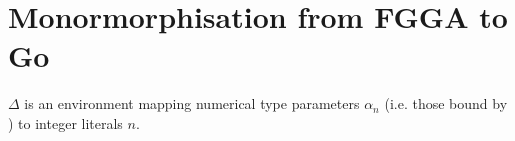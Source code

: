 \section{Monormorphisation from FGGA to Go}

$\Delta$ is an environment mapping numerical type parameters $\alpha_n$ (i.e.
those bound by ) to integer literals $n$.




